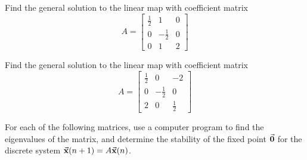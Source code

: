 \newpage

\begin{exercises}
\begin{exercise}
Find the general solution to the linear map with coefficient matrix
\begin{equation}
   A = \begin{bmatrix}
            \frac{1}{2} &  1  &  0 \\
              0         & -\frac{1}{2}  &  0 \\
              0         &  1  &  2
       \end{bmatrix}
\end{equation}
\end{exercise}
\begin{exercise}
Find the general solution to the linear map with coefficient matrix
\begin{equation}
   A = \begin{bmatrix}
            \frac{1}{2} &  0  &  -2 \\
              0         & -\frac{1}{2}  &  0 \\
              2         &  0  &  \frac{1}{2}
       \end{bmatrix}
\end{equation}
\end{exercise}
\begin{exercise}
For each of the following matrices,
use a computer program to find the
eigenvalues of the matrix, and determine
the stability of the fixed point $\vec{\textbf{0}}$
for the discrete system $\vec{\textbf{x}}(n+1) = A\vec{\textbf{x}}(n)$.
\end{exercise}
\end{exercises}
